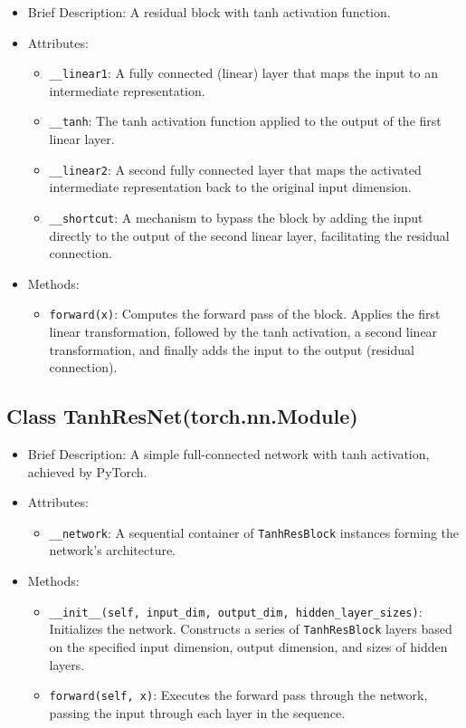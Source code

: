 \begin{itemize}
\item Brief Description: A residual block with tanh activation function.
\item Attributes:
  \begin{itemize}
  \item \lstinline|__linear1|: A fully connected (linear) layer that maps the input to an intermediate representation.
  \item \lstinline|__tanh|: The tanh activation function applied to the output of the first linear layer.
  \item \lstinline|__linear2|: A second fully connected layer that maps the activated intermediate representation back to the original input dimension.
  \item \lstinline|__shortcut|: A mechanism to bypass the block by adding the input directly to the output of the second linear layer, facilitating the residual connection.
  \end{itemize}
\item Methods:
  \begin{itemize}
  \item \lstinline|forward(x)|:
  Computes the forward pass of the block. 
  Applies the first linear transformation, followed by the tanh activation, 
  a second linear transformation, 
  and finally adds the input to the output (residual connection).
  \end{itemize}
\end{itemize}

\subsection{Class TanhResNet(torch.nn.Module)}

\begin{itemize}
\item Brief Description: A simple full-connected network with tanh activation,
  achieved by PyTorch.
\item Attributes:
  \begin{itemize}
  \item \lstinline|__network|: 
  A sequential container of \lstinline|TanhResBlock| instances 
  forming the network's architecture.
  \end{itemize}
\item Methods:
  \begin{itemize}
  \item \lstinline|__init__(self, input_dim, output_dim, hidden_layer_sizes)|: Initializes the network. Constructs a series of \lstinline|TanhResBlock| layers based on the specified input dimension, output dimension, and sizes of hidden layers.
  \item \lstinline|forward(self, x)|: Executes the forward pass through the network, passing the input through each layer in the sequence.
  \end{itemize}
\end{itemize}


